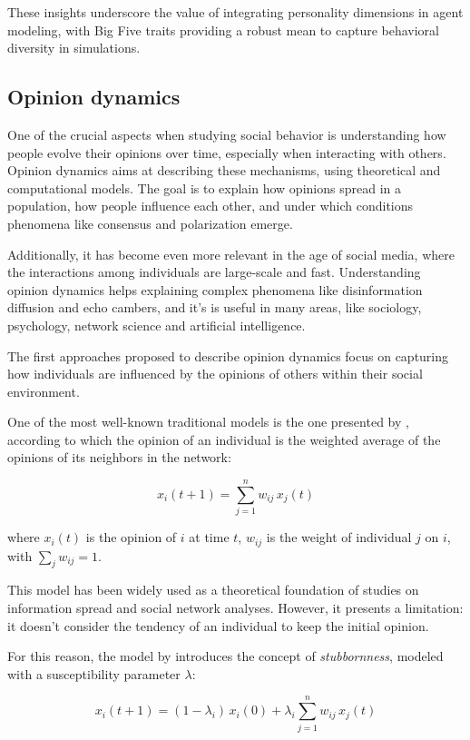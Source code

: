\medskip
These insights underscore the value of integrating personality dimensions in agent modeling, with Big Five traits providing a robust mean to capture behavioral diversity in simulations.




\subsection{Opinion dynamics}
One of the crucial aspects when studying social behavior is understanding how people evolve their opinions over time, especially when interacting with others.
Opinion dynamics aims at describing these mechanisms, using theoretical and computational models.
The goal is to explain how opinions spread in a population, how people influence each other, and under which conditions phenomena like consensus and polarization emerge.

Additionally, it has become even more relevant in the age of social media, where the interactions among individuals are large-scale and fast.
Understanding opinion dynamics helps explaining complex phenomena like disinformation diffusion and echo cambers, and it's is useful in many areas, like sociology, psychology, network science and artificial intelligence.


\medskip
The first approaches proposed to describe opinion dynamics focus on capturing how individuals are influenced by the opinions of others within their social environment.

One of the most well-known traditional models is the one presented by \citet{Degroot1974}, according to which the opinion of an individual is the weighted average of the opinions of its neighbors in the network:

\[
x_i(t+1) = \sum_{j=1}^n w_{ij} \, x_j(t)
\]

where $x_i(t)$ is the opinion of $i$ at time $t$, $w_{ij}$ is the weight of individual $j$ on $i$, with $\sum_{j} w_{ij}=1$.

This model has been widely used as a theoretical foundation of studies on information spread and social network analyses. However, it presents a limitation: it doesn’t consider the tendency of an individual to keep the initial opinion.

For this reason, the model by \citet{friedkin_1990} introduces the concept of \textit{stubbornness}, modeled with a susceptibility parameter $\lambda$:

\[
x_i(t+1) = (1 - \lambda_i) \, x_i(0) + \lambda_i \sum_{j=1}^n w_{ij} \, x_j(t)
\]

